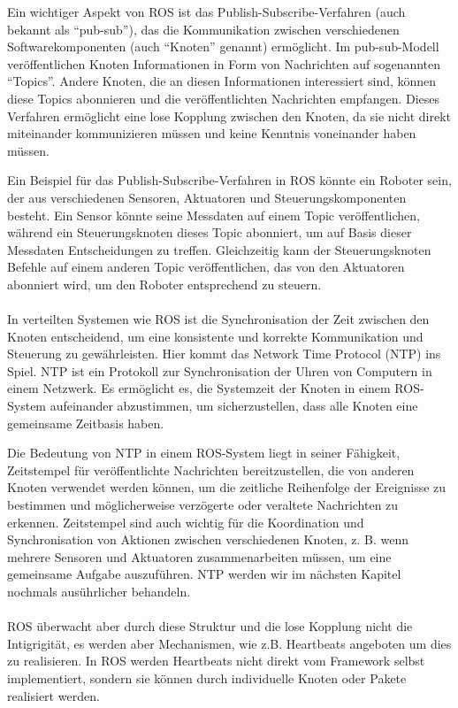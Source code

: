 Ein wichtiger Aspekt von ROS ist das Publish-Subscribe-Verfahren (auch bekannt als \enquote{pub-sub}), das die Kommunikation zwischen verschiedenen Softwarekomponenten (auch \enquote{Knoten} genannt) ermöglicht. Im pub-sub-Modell veröffentlichen Knoten Informationen in Form von Nachrichten auf sogenannten \enquote{Topics}. Andere Knoten, die an diesen Informationen interessiert sind, können diese Topics abonnieren und die veröffentlichten Nachrichten empfangen. Dieses Verfahren ermöglicht eine lose Kopplung zwischen den Knoten, da sie nicht direkt miteinander kommunizieren müssen und keine Kenntnis voneinander haben müssen.

Ein Beispiel für das Publish-Subscribe-Verfahren in ROS könnte ein Roboter sein, der aus verschiedenen Sensoren, Aktuatoren und Steuerungskomponenten besteht. Ein Sensor könnte seine Messdaten auf einem Topic veröffentlichen, während ein Steuerungsknoten dieses Topic abonniert, um auf Basis dieser Messdaten Entscheidungen zu treffen. Gleichzeitig kann der Steuerungsknoten Befehle auf einem anderen Topic veröffentlichen, das von den Aktuatoren abonniert wird, um den Roboter entsprechend zu steuern.
\\\\
In verteilten Systemen wie ROS ist die Synchronisation der Zeit zwischen den Knoten entscheidend, um eine konsistente und korrekte Kommunikation und Steuerung zu gewährleisten. Hier kommt das Network Time Protocol (NTP) ins Spiel. NTP ist ein Protokoll zur Synchronisation der Uhren von Computern in einem Netzwerk. Es ermöglicht es, die Systemzeit der Knoten in einem ROS-System aufeinander abzustimmen, um sicherzustellen, dass alle Knoten eine gemeinsame Zeitbasis haben.

Die Bedeutung von NTP in einem ROS-System liegt in seiner Fähigkeit, Zeitstempel für veröffentlichte Nachrichten bereitzustellen, die von anderen Knoten verwendet werden können, um die zeitliche Reihenfolge der Ereignisse zu bestimmen und möglicherweise verzögerte oder veraltete Nachrichten zu erkennen. Zeitstempel sind auch wichtig für die Koordination und Synchronisation von Aktionen zwischen verschiedenen Knoten, z. B. wenn mehrere Sensoren und Aktuatoren zusammenarbeiten müssen, um eine gemeinsame Aufgabe auszuführen. NTP werden wir im nächsten Kapitel nochmals ausührlicher behandeln. 
\\\\
ROS überwacht aber durch diese Struktur und die lose Kopplung nicht die Intigrigität, es werden aber Mechanismen, wie z.B. Heartbeats angeboten um dies zu realisieren.  In ROS werden Heartbeats nicht direkt vom Framework selbst implementiert, sondern sie können durch individuelle Knoten oder Pakete realisiert werden.

